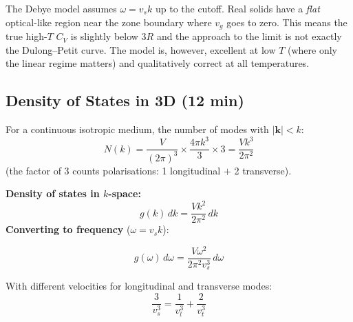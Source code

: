 \documentclass[11pt,a4paper]{article}
\begin{document}
\begin{pitbox}
The Debye model assumes $\omega = v_s k$ up to the cutoff. Real solids have a
\emph{flat} optical-like region near the zone boundary where $v_g$ goes to zero.
This means the true high-$T$ $C_V$ is slightly below $3R$ and the approach to the
limit is not exactly the Dulong--Petit curve. The model is, however, excellent at
low $T$ (where only the linear regime matters) and qualitatively correct at all
temperatures.
\end{pitbox}

\subsection{Density of States in 3D \hfill \small(12 min)}

For a continuous isotropic medium, the number of modes with $|\mathbf k|<k$:
\[
N(k) = \frac{V}{(2\pi)^3}\times\frac{4\pi k^3}{3}\times3 = \frac{Vk^3}{2\pi^2}
\]
(the factor of 3 counts polarisations: 1 longitudinal $+$ 2 transverse).

\textbf{Density of states in $k$-space:}
\[
g(k)\,dk = \frac{Vk^2}{2\pi^2}\,dk
\]
\textbf{Converting to frequency} ($\omega=v_sk$):
\begin{keybox}
\[
g(\omega)\,d\omega = \frac{V\omega^2}{2\pi^2v_s^3}\,d\omega
\]
\end{keybox}
With different velocities for longitudinal and transverse modes:
\[
\frac{3}{v_s^3} = \frac{1}{v_l^3}+\frac{2}{v_t^3}
\]
\end{document}
